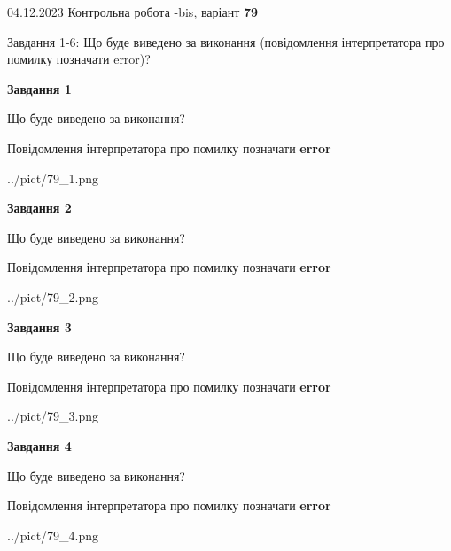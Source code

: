 \documentclass[12pt, ukrainian]{article}
\begin{document}
{{04.12.2023 Контрольна робота -bis, варіант  \No \textbf { 79 }\par}}
{

Завдання 1-6: Що буде виведено за виконання (повідомлення інтерпретатора про помилку позначати error)?


{\begin {center}\textbf{Завдання 1}\end {center}}\par
Що буде виведено за виконання? \par
Повідомлення інтерпретатора про помилку позначати \textbf{error}

\begin{center}
	{../pict/79_1.png}
\end{center}
\newpage

{\begin {center}\textbf{Завдання 2}\end {center}}\par
Що буде виведено за виконання? \par
Повідомлення інтерпретатора про помилку позначати \textbf{error}

\begin{center}
	{../pict/79_2.png}
\end{center}
\newpage

{\begin {center}\textbf{Завдання 3}\end {center}}\par
Що буде виведено за виконання? \par
Повідомлення інтерпретатора про помилку позначати \textbf{error}

\begin{center}
	{../pict/79_3.png}
\end{center}
\newpage

{\begin {center}\textbf{Завдання 4}\end {center}}\par
Що буде виведено за виконання? \par
Повідомлення інтерпретатора про помилку позначати \textbf{error}

\begin{center}
	{../pict/79_4.png}
\end{center}
\newpage

}
\end{document}
